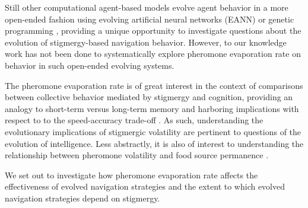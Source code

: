 Still other computational agent-based models evolve agent behavior in a more open-ended fashion using evolving artificial neural networks (EANN) \cite{collins1991antfarm} or genetic programming \cite{connelly2009evolving}, providing a unique opportunity to investigate questions about the evolution of stigmergy-based navigation behavior.
However, to our knowledge work has not been done to systematically explore pheromone evaporation rate on behavior in such open-ended evolving systems.

The pheromone evaporation rate is of great interest in the context of comparisons between collective behavior mediated by stigmergy and cognition, providing an analogy to short-term versus long-term memory and harboring implications with respect to to the speed-accuracy trade-off \cite{couzin2009collective, correia2017role}.
As such, understanding the evolutionary implications of stigmergic volatility are pertinent to questions of the evolution of intelligence.
Less abstractly, it is also of interest to understanding the relationship between pheromone volatility and food source permanence \cite{howard_costs_2001,robinson_decay_2008}.

We set out to investigate how pheromone evaporation rate affects the effectiveness of evolved navigation strategies and the extent to which evolved navigation strategies depend on stigmergy.
